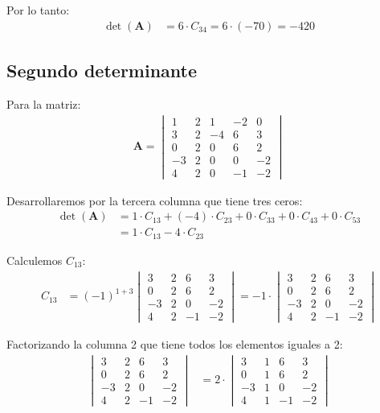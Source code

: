 \documentclass{report} %
\begin{document}
Por lo tanto:
\begin{align*}
\det(\mathbf{A}) &= 6 \cdot C_{34} = 6 \cdot (-70) = -420
\end{align*}

\subsection*{Segundo determinante}
Para la matriz:
\begin{align*}
\mathbf{A} = \begin{vmatrix}
1 & 2 & 1 & -2 & 0 \\
3 & 2 & -4 & 6 & 3 \\
0 & 2 & 0 & 6 & 2 \\
-3 & 2 & 0 & 0 & -2 \\
4 & 2 & 0 & -1 & -2
\end{vmatrix}
\end{align*}

Desarrollaremos por la tercera columna que tiene tres ceros:
\begin{align*}
\det(\mathbf{A}) &= 1 \cdot C_{13} + (-4) \cdot C_{23} + 0 \cdot C_{33} + 0 \cdot C_{43} + 0 \cdot C_{53} \\
&= 1 \cdot C_{13} - 4 \cdot C_{23}
\end{align*}

Calculemos $C_{13}$:
\begin{align*}
C_{13} &= (-1)^{1+3} \begin{vmatrix}
3 & 2 & 6 & 3 \\
0 & 2 & 6 & 2 \\
-3 & 2 & 0 & -2 \\
4 & 2 & -1 & -2
\end{vmatrix} = -1 \cdot \begin{vmatrix}
3 & 2 & 6 & 3 \\
0 & 2 & 6 & 2 \\
-3 & 2 & 0 & -2 \\
4 & 2 & -1 & -2
\end{vmatrix}
\end{align*}

Factorizando la columna 2 que tiene todos los elementos iguales a 2:
\begin{align*}
\begin{vmatrix}
3 & 2 & 6 & 3 \\
0 & 2 & 6 & 2 \\
-3 & 2 & 0 & -2 \\
4 & 2 & -1 & -2
\end{vmatrix} &= 2 \cdot \begin{vmatrix}
3 & 1 & 6 & 3 \\
0 & 1 & 6 & 2 \\
-3 & 1 & 0 & -2 \\
4 & 1 & -1 & -2
\end{vmatrix}
\end{align*}
\end{document}
